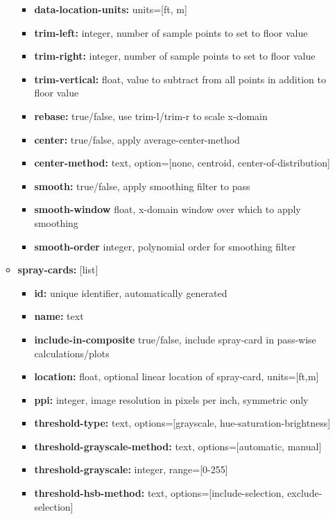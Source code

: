 \documentclass[10pt,letterpaper,titlepage]{article}
\begin{document}
\begin{itemize}
\begin{itemize}
\begin{itemize}
                \item \textbf{data-location-units:} units=[ft, m]
                \item \textbf{trim-left:} integer, number of sample points to set to floor value
                \item \textbf{trim-right:} integer, number of sample points to set to floor value
                \item \textbf{trim-vertical:} float, value to subtract from all points in addition to floor value
                \item \textbf{rebase:} true/false, use trim-l/trim-r to scale x-domain 
                \item \textbf{center:} true/false, apply average-center-method
                \item \textbf{center-method:} text, option=[none, centroid, center-of-distribution]
                \item \textbf{smooth:} true/false, apply smoothing filter to pass
                \item \textbf{smooth-window} float, x-domain window over which to apply smoothing
                \item \textbf{smooth-order} integer, polynomial order for smoothing filter
            \end{itemize}
            \item \textbf{spray-cards:} [list]
            \begin{itemize}
                \item \textbf{id:} unique identifier, automatically generated
                \item \textbf{name:} text
                \item \textbf{include-in-composite} true/false, include spray-card in pass-wise calculations/plots
                \item \textbf{location:} float, optional linear location of spray-card, units=[ft,m]
                \item \textbf{ppi:} integer, image resolution in pixels per inch, symmetric only
                \item \textbf{threshold-type:} text, options=[grayscale, hue-saturation-brightness]
                \item \textbf{threshold-grayscale-method:} text, options=[automatic, manual]
                \item \textbf{threshold-grayscale:} integer, range=[0-255]
                \item \textbf{threshold-hsb-method:} text, options=[include-selection, exclude-selection]

\end{itemize}
\end{itemize}
\end{itemize}
\end{document}
